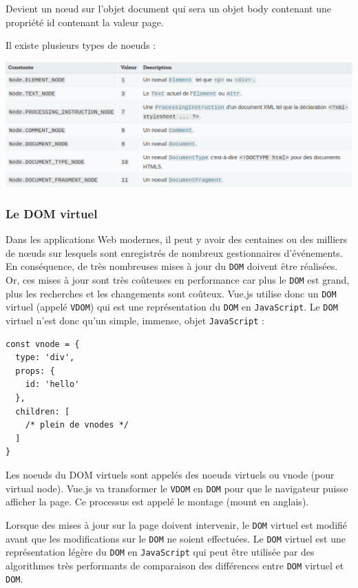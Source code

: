 Devient un nœud sur l'objet document qui sera un objet body contenant une propriété id contenant la valeur page.

Il existe plusieurs types de noeuds :
\begin{center}
\includegraphics[width=15cm]{images/image07.png}
\end{center}

\subsubsection{Le DOM virtuel}
Dans les applications Web modernes, il peut y avoir des centaines ou des milliers de nœuds sur lesquels sont enregistrés de nombreux gestionnaires d'événements. En conséquence, de très nombreuses mises à jour du {\tt DOM} doivent être réalisées. Or, ces mises à jour sont très coûteuses en performance car plus le {\tt DOM} est grand, plus les recherches et les changements sont coûteux. {\color{monOrange}Vue.js} utilise donc un {\tt DOM} virtuel (appelé {\tt VDOM}) qui est une représentation du {\tt DOM} en {\tt JavaScript}. Le {\tt DOM } virtuel n'est donc qu'un simple, immense, objet {\tt JavaScript} :
\begin{verbatim}
const vnode = {
  type: 'div',
  props: {
    id: 'hello'
  },
  children: [
    /* plein de vnodes */
  ]
}
\end{verbatim} 

Les noeuds du DOM virtuels sont appelés des noeuds virtuels ou {\color{monOrange}vnode} (pour virtual node). {\color{monOrange}Vue.js} va transformer le {\tt VDOM} en {\tt DOM} pour que le navigateur puisse afficher la page. Ce processus est appelé le montage (mount en anglais).

Lorsque des mises à jour sur la page doivent intervenir, le {\tt DOM} virtuel est modifié avant que les modifications sur le {\tt DOM} ne soient effectuées. Le {\tt DOM} virtuel est une représentation légère du {\tt DOM} en {\tt JavaScript} qui peut être utilisée par des algorithmes très performants de comparaison des différences entre {\tt DOM} virtuel et {\tt DOM}.

